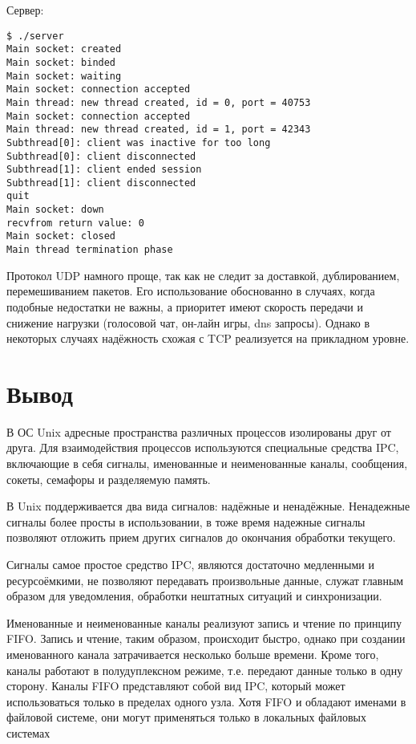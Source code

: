 \documentclass[a4paper]{article}
\begin{document}
	Сервер:
	\begin{lstlisting}[style=crs_bash]
$ ./server 
Main socket: created
Main socket: binded
Main socket: waiting
Main socket: connection accepted
Main thread: new thread created, id = 0, port = 40753
Main socket: connection accepted
Main thread: new thread created, id = 1, port = 42343
Subthread[0]: client was inactive for too long
Subthread[0]: client disconnected
Subthread[1]: client ended session
Subthread[1]: client disconnected
quit
Main socket: down
recvfrom return value: 0
Main socket: closed
Main thread termination phase
	\end{lstlisting}
	
	Протокол UDP намного проще, так как не следит за доставкой, дублированием, перемешиванием пакетов. Его использование обоснованно в случаях, когда подобные недостатки не важны, а приоритет имеют скорость передачи и снижение нагрузки (голосовой чат, он-лайн игры, dns запросы). Однако в некоторых случаях надёжность схожая с TCP реализуется на прикладном уровне.
	
\section{Вывод}
	В ОС Unix адресные пространства различных процессов изолированы друг от друга. Для взаимодействия процессов используются специальные средства IPC, включающие в себя сигналы, именованные и неименованные каналы, сообщения, сокеты, семафоры и разделяемую память.
	
	В Unix поддерживается два вида сигналов: надёжные и ненадёжные. Ненадежные сигналы более просты в использовании, в тоже время надежные сигналы позволяют отложить прием других сигналов до окончания обработки текущего.
	
	Сигналы самое простое средство IPC, являются достаточно медленными и ресурсоёмкими, не позволяют передавать произвольные данные, служат главным образом для уведомления, обработки нештатных ситуаций и синхронизации.
	
	Именованные и неименованные каналы реализуют запись и чтение по принципу FIFO. Запись и чтение, таким образом, происходит быстро, однако при создании именованного канала затрачивается несколько больше времени. Кроме того, каналы работают в полудуплексном режиме, т.е. передают данные только в одну сторону. Каналы FIFO представляют собой вид IPC, который может использоваться только в пределах одного узла. Хотя FIFO и обладают именами в файловой системе, они могут применяться только в локальных файловых системах
\end{document}
